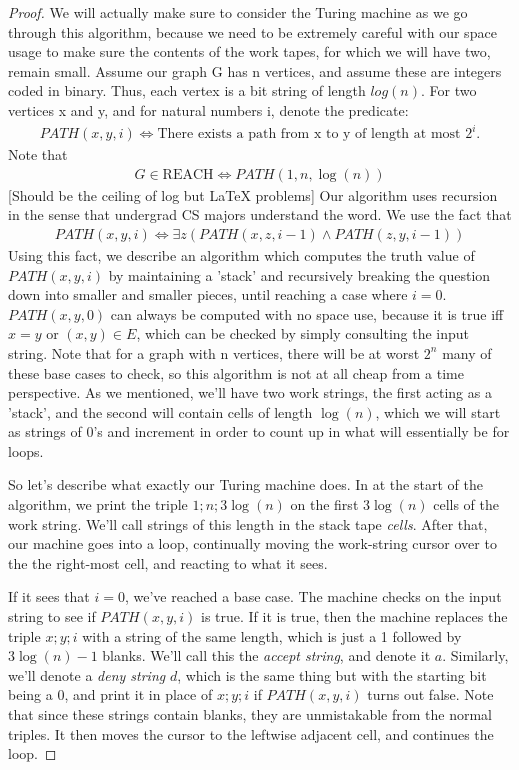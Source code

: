 \begin{proof}
We will actually make sure to consider the Turing machine as we go through this algorithm, because we need to be extremely careful with our space usage to make sure the contents of the work tapes, for which we will have two, remain small. Assume our graph G has n vertices, and assume these are integers coded in binary. Thus, each vertex is a bit string of length $log(n)$. For two vertices x and y, and for natural numbers i, denote the predicate:
\begin{align}
    PATH(x,y,i) \iff \textrm{There exists a path from x to y of length at most $2^i$.}
\end{align}
Note that 
\begin{align}
    G \in \textrm{REACH} \iff PATH(1,n,\log(n))
\end{align}
[Should be the ceiling of log but LaTeX problems]
Our algorithm uses recursion in the sense that undergrad CS majors understand the word. We use the fact that 
\begin{align}
    PATH(x,y,i) \iff \exists z (PATH(x,z,i-1)\wedge PATH(z,y,i-1))
\end{align}
Using this fact, we describe an algorithm which computes the truth value of $PATH(x,y,i)$ by maintaining a 'stack' and recursively breaking the question down into smaller and smaller pieces, until reaching a case where $i=0$. $PATH(x,y,0)$ can always be computed with no space use, because it is true iff $x=y$ or $(x,y) \in E$, which can be checked by simply consulting the input string. Note that for a graph with n vertices, there will be at worst $2^n$ many of these base cases to check, so this algorithm is not at all cheap from a time perspective. As we mentioned, we'll have two work strings, the first acting as a 'stack', and the second will contain cells of length $\log(n)$, which we will start as strings of 0's and increment in order to count up in what will essentially be for loops. 
\par So let's describe what exactly our Turing machine does. In at the start of the algorithm, we print the triple $1;n;3\log(n)$ on the first $3\log(n)$ cells of the work string. We'll call strings of this length in the stack tape \textit{cells}. After that, our machine goes into a loop, continually moving the work-string cursor over to the the right-most cell, and reacting to what it sees.
\par If it sees that $i=0$, we've reached a base case. The machine checks on the input string to see if $PATH(x,y,i)$ is true. If it is true, then the machine replaces the triple $x;y;i$ with a string of the same length, which is just a 1 followed by $3\log(n)-1$ blanks. We'll call this the \textit{accept string}, and denote it $a$. Similarly, we'll denote a \textit{deny string} $d$, which is the same thing but with the starting bit being a 0, and print it in place of $x;y;i$ if $PATH(x,y,i)$ turns out false. Note that since these strings contain blanks, they are unmistakable from the normal triples. It then moves the cursor to the leftwise adjacent cell, and continues the loop.

\end{proof}
